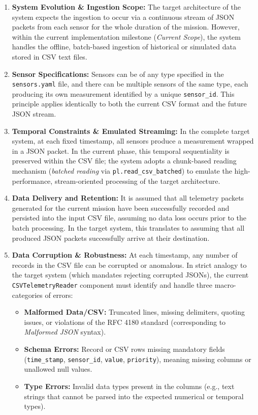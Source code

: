 \documentclass[11pt, a4paper]{article}
\begin{document}
\begin{enumerate}[label=\textbf{DA-\arabic*:}, align=left, leftmargin=2cm]
    \item \textbf{System Evolution \& Ingestion Scope:} The target architecture of the system expects the ingestion to occur via a continuous stream of JSON packets from each sensor for the whole duration of the mission. However, within the current implementation milestone (\textit{Current Scope}), the system handles the offline, batch-based ingestion of historical or simulated data stored in CSV text files.

    \item \textbf{Sensor Specifications:} Sensors can be of any type specified in the \texttt{sensors.yaml} file, and there can be multiple sensors of the same type, each producing its own measurement identified by a unique \texttt{sensor\_id}. This principle applies identically to both the current CSV format and the future JSON stream.

    \item \textbf{Temporal Constraints \& Emulated Streaming:} In the complete target system, at each fixed timestamp, all sensors produce a measurement wrapped in a JSON packet. In the current phase, this temporal sequentiality is preserved within the CSV file; the system adopts a chunk-based reading mechanism (\textit{batched reading} via \texttt{pl.read\_csv\_batched}) to emulate the high-performance, stream-oriented processing of the target architecture.

    \item \textbf{Data Delivery and Retention:} It is assumed that all telemetry packets generated for the current mission have been successfully recorded and persisted into the input CSV file, assuming no data loss occurs prior to the batch processing. In the target system, this translates to assuming that all produced JSON packets successfully arrive at their destination.

    \item \textbf{Data Corruption \& Robustness:} At each timestamp, any number of records in the CSV file can be corrupted or anomalous. In strict analogy to the target system (which mandates rejecting corrupted JSONs), the current \texttt{CSVTelemetryReader} component must identify and handle three macro-categories of errors:
    \begin{itemize}[leftmargin=0.5cm]
        \item \textbf{Malformed Data/CSV:} Truncated lines, missing delimiters, quoting issues, or violations of the RFC 4180 standard (corresponding to \textit{Malformed JSON} syntax).
        \item \textbf{Schema Errors:} Record or CSV rows missing mandatory fields (\texttt{time\_stamp}, \texttt{sensor\_id}, \texttt{value}, \texttt{priority}), meaning missing columns or unallowed null values.
        \item \textbf{Type Errors:} Invalid data types present in the columns (e.g., text strings that cannot be parsed into the expected numerical or temporal types).
    \end{itemize}


\end{enumerate}
\end{document}
